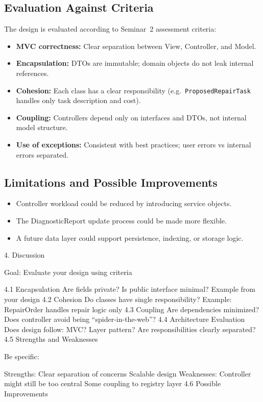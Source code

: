 \documentclass[a4paper]{scrartcl}
\begin{document}
\subsection{Evaluation Against Criteria}
The design is evaluated according to Seminar~2 assessment criteria:
\begin{itemize}
  \item \textbf{MVC correctness:} 
        Clear separation between View, Controller, and Model.
  \item \textbf{Encapsulation:}
        DTOs are immutable; domain objects do not leak internal references.
  \item \textbf{Cohesion:}
        Each class has a clear responsibility (e.g.\ 
        \texttt{ProposedRepairTask} handles only task description and cost).
  \item \textbf{Coupling:}
        Controllers depend only on interfaces and DTOs, not internal model structure.
  \item \textbf{Use of exceptions:} 
        Consistent with best practices; user errors vs internal errors separated.
\end{itemize}

\subsection{Limitations and Possible Improvements}
\begin{itemize}
  \item Controller workload could be reduced by introducing service objects.
  \item The DiagnosticReport update process could be made more flexible.
  \item A future data layer could support persistence, indexing, or storage logic.
\end{itemize}

4. Discussion

Goal: Evaluate your design using criteria

4.1 Encapsulation
Are fields private?
Is public interface minimal?
Example from your design
4.2 Cohesion
Do classes have single responsibility?
Example:
RepairOrder handles repair logic only
4.3 Coupling
Are dependencies minimized?
Does controller avoid being “spider-in-the-web”?
4.4 Architecture Evaluation
Does design follow:
MVC?
Layer pattern?
Are responsibilities clearly separated?
4.5 Strengths and Weaknesses

Be specific:

Strengths:
Clear separation of concerns
Scalable design
Weaknesses:
Controller might still be too central
Some coupling to registry layer
4.6 Possible Improvements
\end{document}
